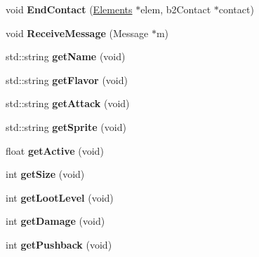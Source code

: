 \begin{DoxyCompactItemize}
\item 
\hypertarget{class_weapon_a1860f840f8c75555de52450300139d9b}{void {\bfseries End\+Contact} (\hyperlink{class_elements}{Elements} $\ast$elem, b2\+Contact $\ast$contact)}\label{class_weapon_a1860f840f8c75555de52450300139d9b}

\item 
\hypertarget{class_weapon_ad93665811c3df9c05bb22b9a1a9c1a66}{void {\bfseries Receive\+Message} (Message $\ast$m)}\label{class_weapon_ad93665811c3df9c05bb22b9a1a9c1a66}

\item 
\hypertarget{class_weapon_aa49263888dca8ee505a95294371adbf6}{std\+::string {\bfseries get\+Name} (void)}\label{class_weapon_aa49263888dca8ee505a95294371adbf6}

\item 
\hypertarget{class_weapon_abe73556e16426da65572d7981dcc800f}{std\+::string {\bfseries get\+Flavor} (void)}\label{class_weapon_abe73556e16426da65572d7981dcc800f}

\item 
\hypertarget{class_weapon_a693e8f30f48b5df1983c22fdf796f25b}{std\+::string {\bfseries get\+Attack} (void)}\label{class_weapon_a693e8f30f48b5df1983c22fdf796f25b}

\item 
\hypertarget{class_weapon_ace3e431278e9ac23f33d222c67c38497}{std\+::string {\bfseries get\+Sprite} (void)}\label{class_weapon_ace3e431278e9ac23f33d222c67c38497}

\item 
\hypertarget{class_weapon_aea6024533cc9ca0ce72139ebf5da33f9}{float {\bfseries get\+Active} (void)}\label{class_weapon_aea6024533cc9ca0ce72139ebf5da33f9}

\item 
\hypertarget{class_weapon_a47baa57bfa8b9bfeda891d3180caa399}{int {\bfseries get\+Size} (void)}\label{class_weapon_a47baa57bfa8b9bfeda891d3180caa399}

\item 
\hypertarget{class_weapon_a64da6983673bfcac2d7de62ab92640f1}{int {\bfseries get\+Loot\+Level} (void)}\label{class_weapon_a64da6983673bfcac2d7de62ab92640f1}

\item 
\hypertarget{class_weapon_a35f92fc79c009c1d1d7d41b4fa17bb11}{int {\bfseries get\+Damage} (void)}\label{class_weapon_a35f92fc79c009c1d1d7d41b4fa17bb11}

\item 
\hypertarget{class_weapon_a60a49fa0a0a76a58698d9b4000815a8b}{int {\bfseries get\+Pushback} (void)}\label{class_weapon_a60a49fa0a0a76a58698d9b4000815a8b}


\end{DoxyCompactItemize}
